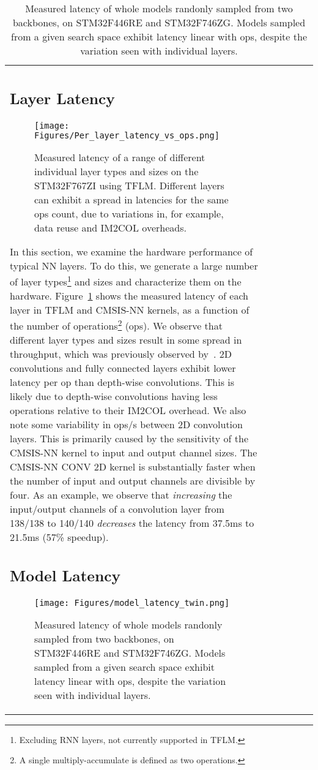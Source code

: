 \documentclass{article}
\begin{document}
\begin{table}[t]
\begin{tabular}{l| c | c | c | c | c}
\subsection{Layer Latency}

 
\begin{figure}[t]
    \texttt{[image: Figures/Per\_layer\_latency\_vs\_ops.png]}
    \vspace{-20pt} 
    \caption{
    Measured latency of a range of different individual layer types and sizes on the STM32F767ZI using TFLM.
    Different layers can exhibit a spread in latencies for the same ops count, due to variations in, for example, data reuse and IM2COL overheads.
    }
    \label{fig:per-layer}
\end{figure}


In this section, we examine the hardware performance of typical NN layers.
To do this, we generate a large number of layer types\footnote{Excluding RNN layers, not currently supported in TFLM.} and sizes and characterize them on the hardware.
Figure~\ref{fig:per-layer} shows the measured latency of each layer in TFLM and CMSIS-NN kernels, as a function of the number of operations\footnote{A single multiply-accumulate is defined as two operations.} (ops).
We observe that different layer types and sizes result in some spread in throughput, which was previously observed by~\citet{lai2018notallops}.
2D convolutions and fully connected layers exhibit lower latency per op than depth-wise convolutions. 
This is likely due to depth-wise convolutions having less operations relative to their IM2COL overhead.
We also note some variability in ops/s between 2D convolution layers. This is primarily caused by the sensitivity of the CMSIS-NN kernel to input and output channel sizes. 
The CMSIS-NN CONV 2D kernel is substantially faster when the number of input and output channels are divisible by four.
As an example, we observe that \textit{increasing} the input/output channels of a convolution layer from 138/138 to 140/140 \textit{decreases} the latency from 37.5ms to 21.5ms (57\% speedup).


\subsection{Model Latency}

\begin{figure}[t]
\texttt{[image: Figures/model\_latency\_twin.png]}
     \vspace{-20pt}
     \caption{
     Measured latency of whole models randonly sampled from two backbones, on STM32F446RE and STM32F746ZG.
     Models sampled from a given search space exhibit latency linear with ops, despite the variation seen with individual layers.
     }
     \label{fig:model_latency_vs_ops}
\end{figure}


\end{tabular}
\end{table}
\end{document}

